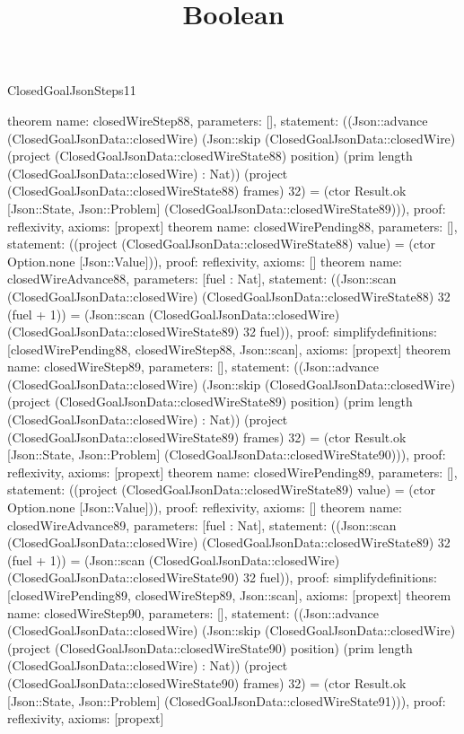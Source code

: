 \begin{lexlean}{ClosedGoalJsonSteps11}
\title{Boolean}
\begin{semanticmodule}
theorem{
 name: closedWireStep88, parameters: [],
 statement: ((Json::advance (ClosedGoalJsonData::closedWire) (Json::skip (ClosedGoalJsonData::closedWire) (project (ClosedGoalJsonData::closedWireState88) position) (prim length (ClosedGoalJsonData::closedWire) : Nat)) (project (ClosedGoalJsonData::closedWireState88) frames) 32) = (ctor Result.ok [Json::State, Json::Problem] (ClosedGoalJsonData::closedWireState89))), proof: reflexivity{}, axioms: [propext]
}
theorem{
 name: closedWirePending88, parameters: [],
 statement: ((project (ClosedGoalJsonData::closedWireState88) value) = (ctor Option.none [Json::Value])), proof: reflexivity{}, axioms: []
}
theorem{
 name: closedWireAdvance88, parameters: [fuel : Nat],
 statement: ((Json::scan (ClosedGoalJsonData::closedWire) (ClosedGoalJsonData::closedWireState88) 32 (fuel + 1)) = (Json::scan (ClosedGoalJsonData::closedWire) (ClosedGoalJsonData::closedWireState89) 32 fuel)), proof: simplify{definitions: [closedWirePending88, closedWireStep88, Json::scan]}, axioms: [propext]
}
theorem{
 name: closedWireStep89, parameters: [],
 statement: ((Json::advance (ClosedGoalJsonData::closedWire) (Json::skip (ClosedGoalJsonData::closedWire) (project (ClosedGoalJsonData::closedWireState89) position) (prim length (ClosedGoalJsonData::closedWire) : Nat)) (project (ClosedGoalJsonData::closedWireState89) frames) 32) = (ctor Result.ok [Json::State, Json::Problem] (ClosedGoalJsonData::closedWireState90))), proof: reflexivity{}, axioms: [propext]
}
theorem{
 name: closedWirePending89, parameters: [],
 statement: ((project (ClosedGoalJsonData::closedWireState89) value) = (ctor Option.none [Json::Value])), proof: reflexivity{}, axioms: []
}
theorem{
 name: closedWireAdvance89, parameters: [fuel : Nat],
 statement: ((Json::scan (ClosedGoalJsonData::closedWire) (ClosedGoalJsonData::closedWireState89) 32 (fuel + 1)) = (Json::scan (ClosedGoalJsonData::closedWire) (ClosedGoalJsonData::closedWireState90) 32 fuel)), proof: simplify{definitions: [closedWirePending89, closedWireStep89, Json::scan]}, axioms: [propext]
}
theorem{
 name: closedWireStep90, parameters: [],
 statement: ((Json::advance (ClosedGoalJsonData::closedWire) (Json::skip (ClosedGoalJsonData::closedWire) (project (ClosedGoalJsonData::closedWireState90) position) (prim length (ClosedGoalJsonData::closedWire) : Nat)) (project (ClosedGoalJsonData::closedWireState90) frames) 32) = (ctor Result.ok [Json::State, Json::Problem] (ClosedGoalJsonData::closedWireState91))), proof: reflexivity{}, axioms: [propext]
}
\end{semanticmodule}
\end{lexlean}
